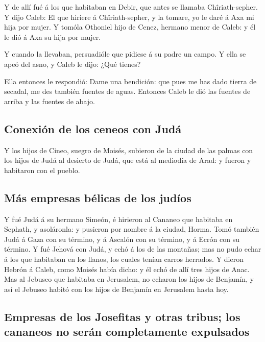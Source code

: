  Y de allí fué á los que habitaban en Debir, que antes se
llamaba Chîriath-sepher.  Y dijo Caleb: El que hiriere á
Chîriath-sepher, y la tomare, yo le daré á Axa mi hija por mujer.
 Y tomóla Othoniel hijo de Cenez, hermano menor de Caleb:
y él le dió á Axa su hija por mujer.

 Y cuando la llevaban, persuadióle que pidiese á su padre
un campo. Y ella se apeó del asno, y Caleb le dijo: ¿Qué tienes?

 Ella entonces le respondió: Dame una bendición: que pues
me has dado tierra de secadal, me des también fuentes de aguas. Entonces
Caleb le dió las fuentes de arriba y las fuentes de abajo.

\hypertarget{conexiuxf3n-de-los-ceneos-con-juduxe1}{%
\subsection{Conexión de los ceneos con
Judá}\label{conexiuxf3n-de-los-ceneos-con-juduxe1}}

 Y los hijos de Cineo, suegro de Moisés, subieron de la
ciudad de las palmas con los hijos de Judá al desierto de Judá, que está
al mediodía de Arad: y fueron y habitaron con el pueblo.

\hypertarget{muxe1s-empresas-buxe9licas-de-los-juduxedos}{%
\subsection{Más empresas bélicas de los
judíos}\label{muxe1s-empresas-buxe9licas-de-los-juduxedos}}

 Y fué Judá á su hermano Simeón, é hirieron al Cananeo
que habitaba en Sephath, y asoláronla: y pusieron por nombre á la
ciudad, Horma.  Tomó también Judá á Gaza con su término,
y á Ascalón con su término, y á Ecrón con su término.  Y
fué Jehová con Judá, y echó á los de las montañas; mas no pudo echar á
los que habitaban en los llanos, los cuales tenían carros herrados.
 Y dieron Hebrón á Caleb, como Moisés había dicho: y él
echó de allí tres hijos de Anac.  Mas al Jebuseo que
habitaba en Jerusalem, no echaron los hijos de Benjamín, y así el
Jebuseo habitó con los hijos de Benjamín en Jerusalem hasta hoy.

\hypertarget{empresas-de-los-josefitas-y-otras-tribus-los-cananeos-no-seruxe1n-completamente-expulsados}{%
\subsection{Empresas de los Josefitas y otras tribus; los cananeos no
serán completamente
expulsados}\label{empresas-de-los-josefitas-y-otras-tribus-los-cananeos-no-seruxe1n-completamente-expulsados}}

